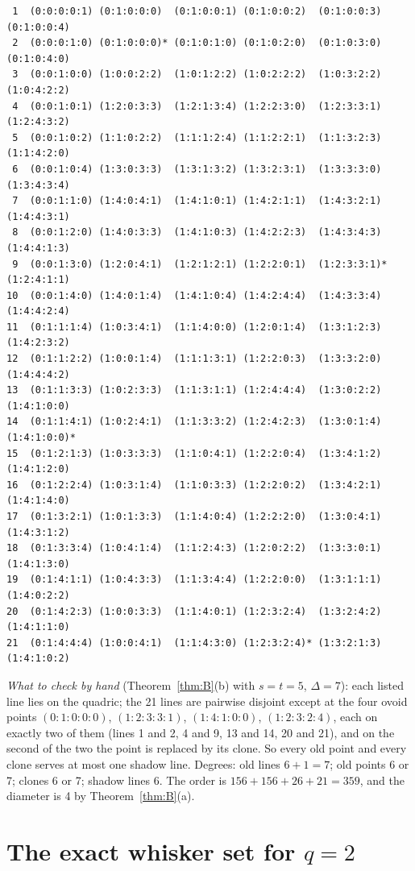 \documentclass[11pt]{amsart}
\theoremstyle{definition}
\theoremstyle{remark}
\numberwithin{equation}{section}
\begin{document}
{\small
\begin{verbatim}
 1  (0:0:0:0:1) (0:1:0:0:0)  (0:1:0:0:1) (0:1:0:0:2)  (0:1:0:0:3)  (0:1:0:0:4)
 2  (0:0:0:1:0) (0:1:0:0:0)* (0:1:0:1:0) (0:1:0:2:0)  (0:1:0:3:0)  (0:1:0:4:0)
 3  (0:0:1:0:0) (1:0:0:2:2)  (1:0:1:2:2) (1:0:2:2:2)  (1:0:3:2:2)  (1:0:4:2:2)
 4  (0:0:1:0:1) (1:2:0:3:3)  (1:2:1:3:4) (1:2:2:3:0)  (1:2:3:3:1)  (1:2:4:3:2)
 5  (0:0:1:0:2) (1:1:0:2:2)  (1:1:1:2:4) (1:1:2:2:1)  (1:1:3:2:3)  (1:1:4:2:0)
 6  (0:0:1:0:4) (1:3:0:3:3)  (1:3:1:3:2) (1:3:2:3:1)  (1:3:3:3:0)  (1:3:4:3:4)
 7  (0:0:1:1:0) (1:4:0:4:1)  (1:4:1:0:1) (1:4:2:1:1)  (1:4:3:2:1)  (1:4:4:3:1)
 8  (0:0:1:2:0) (1:4:0:3:3)  (1:4:1:0:3) (1:4:2:2:3)  (1:4:3:4:3)  (1:4:4:1:3)
 9  (0:0:1:3:0) (1:2:0:4:1)  (1:2:1:2:1) (1:2:2:0:1)  (1:2:3:3:1)* (1:2:4:1:1)
10  (0:0:1:4:0) (1:4:0:1:4)  (1:4:1:0:4) (1:4:2:4:4)  (1:4:3:3:4)  (1:4:4:2:4)
11  (0:1:1:1:4) (1:0:3:4:1)  (1:1:4:0:0) (1:2:0:1:4)  (1:3:1:2:3)  (1:4:2:3:2)
12  (0:1:1:2:2) (1:0:0:1:4)  (1:1:1:3:1) (1:2:2:0:3)  (1:3:3:2:0)  (1:4:4:4:2)
13  (0:1:1:3:3) (1:0:2:3:3)  (1:1:3:1:1) (1:2:4:4:4)  (1:3:0:2:2)  (1:4:1:0:0)
14  (0:1:1:4:1) (1:0:2:4:1)  (1:1:3:3:2) (1:2:4:2:3)  (1:3:0:1:4)  (1:4:1:0:0)*
15  (0:1:2:1:3) (1:0:3:3:3)  (1:1:0:4:1) (1:2:2:0:4)  (1:3:4:1:2)  (1:4:1:2:0)
16  (0:1:2:2:4) (1:0:3:1:4)  (1:1:0:3:3) (1:2:2:0:2)  (1:3:4:2:1)  (1:4:1:4:0)
17  (0:1:3:2:1) (1:0:1:3:3)  (1:1:4:0:4) (1:2:2:2:0)  (1:3:0:4:1)  (1:4:3:1:2)
18  (0:1:3:3:4) (1:0:4:1:4)  (1:1:2:4:3) (1:2:0:2:2)  (1:3:3:0:1)  (1:4:1:3:0)
19  (0:1:4:1:1) (1:0:4:3:3)  (1:1:3:4:4) (1:2:2:0:0)  (1:3:1:1:1)  (1:4:0:2:2)
20  (0:1:4:2:3) (1:0:0:3:3)  (1:1:4:0:1) (1:2:3:2:4)  (1:3:2:4:2)  (1:4:1:1:0)
21  (0:1:4:4:4) (1:0:0:4:1)  (1:1:4:3:0) (1:2:3:2:4)* (1:3:2:1:3)  (1:4:1:0:2)
\end{verbatim}
}

\emph{What to check by hand} (Theorem~\ref{thm:B}(b) with $s=t=5$, $\Delta=7$): each listed line lies on the quadric; the 21
lines are pairwise disjoint except at the four ovoid points $(0:1:0:0:0)$, $(1:2:3:3:1)$, $(1:4:1:0:0)$, $(1:2:3:2:4)$, each on
exactly two of them (lines 1 and 2, 4 and 9, 13 and 14, 20 and 21), and on the second of the two the point is replaced by its
clone. So every old point and every clone serves at most one shadow line. Degrees: old lines $6+1=7$; old points 6 or 7;
clones 6 or 7; shadow lines 6. The order is $156+156+26+21=359$, and the diameter is 4 by Theorem~\ref{thm:B}(a).

\section{The exact whisker set for $q=2$}\label{app:q2}
\end{document}
